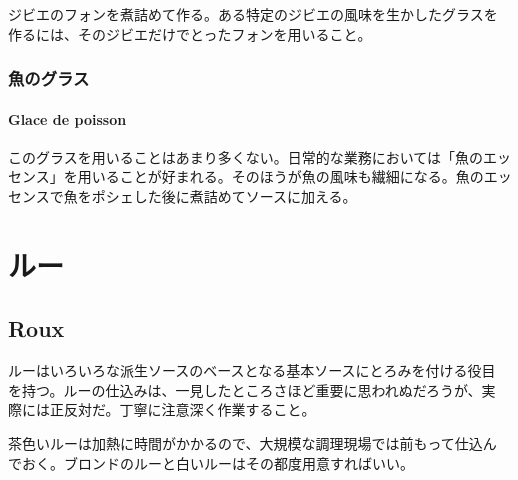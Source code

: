 \begin{recette}
ジビエのフォンを煮詰めて作る。ある特定のジビエの風味を生かしたグラスを
作るには、そのジビエだけでとったフォンを用いること。

\maeaki

\hypertarget{glacedepoisson}{%
\subsubsection{魚のグラス}\label{glacedepoisson}}

\hypertarget{glace-de-poisson}{%
\paragraph{Glace de poisson}\label{glace-de-poisson}}


このグラスを用いることはあまり多くない。日常的な業務においては「魚のエッ
センス」を用いることが好まれる。そのほうが魚の風味も繊細になる。魚のエッ
センスで魚をポシェした後に煮詰めてソースに加える。
\end{recette}


\hypertarget{rouu}{%
\section{ルー}\label{rouu}}

\hypertarget{roux}{%
\subsection{Roux}\label{roux}}

 

ルーはいろいろな派生ソースのベースとなる基本ソースにとろみを付ける役目
を持つ。ルーの仕込みは、一見したところさほど重要に思われぬだろうが、実
際には正反対だ。丁寧に注意深く作業すること。

茶色いルーは加熱に時間がかかるので、大規模な調理現場では前もって仕込ん
でおく。ブロンドのルーと白いルーはその都度用意すればいい。

